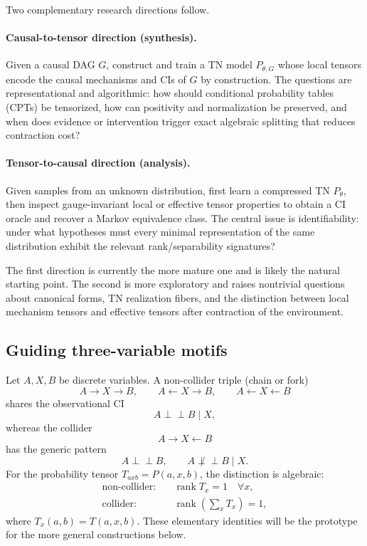 \documentclass[11pt]{article}
\theoremstyle{remark}
\newcommand{\indep}{\perp\!\!\!\perp}
\newcommand{\rank}{\operatorname{rank}}
\begin{document}
Two complementary research directions follow.

\paragraph{Causal-to-tensor direction (synthesis).}
Given a causal DAG $G$, construct and train a TN model $P_{\theta,G}$ whose local tensors encode the causal mechanisms and CIs of $G$ by construction. The questions are representational and algorithmic: how should conditional probability tables (CPTs) be tensorized, how can positivity and normalization be preserved, and when does evidence or intervention trigger exact algebraic splitting that reduces contraction cost?

\paragraph{Tensor-to-causal direction (analysis).}
Given samples from an unknown distribution, first learn a compressed TN $P_\theta$, then inspect gauge-invariant local or effective tensor properties to obtain a CI oracle and recover a Markov equivalence class. The central issue is identifiability: under what hypotheses must every minimal representation of the same distribution exhibit the relevant rank/separability signatures?

The first direction is currently the more mature one and is likely the natural starting point. The second is more exploratory and raises nontrivial questions about canonical forms, TN realization fibers, and the distinction between local mechanism tensors and effective tensors after contraction of the environment.

\subsection{Guiding three-variable motifs}

Let $A,X,B$ be discrete variables. A non-collider triple (chain or fork)
\begin{equation}
A\to X\to B,\qquad A\leftarrow X\to B,\qquad A\leftarrow X\leftarrow B
\end{equation}
shares the observational CI
\begin{equation}
A\indep B\mid X,
\end{equation}
whereas the collider
\begin{equation}
A\to X\leftarrow B
\end{equation}
has the generic pattern
\begin{equation}
A\indep B,\qquad A\not\indep B\mid X.
\end{equation}
For the probability tensor $T_{axb}=P(a,x,b)$, the distinction is algebraic:
\begin{align}
\text{non-collider:}\quad & \rank T_x=1\quad\forall x,\label{eq:intro-noncollider}\\
\text{collider:}\quad & \rank\!\left(\sum_x T_x\right)=1,\label{eq:intro-collider}
\end{align}
where $T_x(a,b)=T(a,x,b)$. These elementary identities will be the prototype for the more general constructions below.
\end{document}
